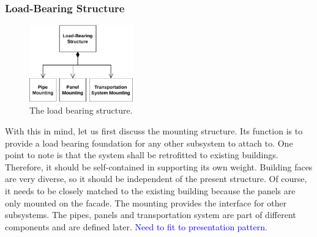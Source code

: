 \subsubsection{Load-Bearing Structure}
\begin{figure}
	\caption{The load bearing structure.}
	\label{wfig:load}
	\includegraphics[width=0.4\textwidth]{img/architecture/load.pdf}
\end{figure} 
With this in mind, let us first discuss the mounting structure.
Its function is to provide a load bearing foundation for any other subsystem to attach to.
One point to note is that the system shall be retrofitted to existing buildings.
Therefore, it should be self-contained in supporting its own weight.
Building faces are very diverse, so it should be independent of the present structure.
Of course, it needs to be closely matched to the existing building because the panels are only mounted on the facade.
The mounting provides the interface for other subsystems.
The pipes, panels and transportation system are part of different components and are defined later.
\textcolor{Blue}{Need to fit to presentation pattern.}


